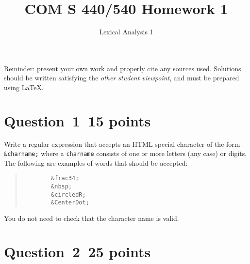 \documentclass[10pt]{article}
\title{COM S 440/540 Homework 1}
\date{}
\author{Lexical Analysis 1}
\renewcommand{\thepage}{~}
\begin{document}
\maketitle

\noindent
Reminder: present your own work and properly cite any sources used.
Solutions should be written satisfying the \emph{other student viewpoint},
and must be prepared using \LaTeX.
\renewcommand{\thepage}{~}
 
\section*{Question~1~\hfill 15 points}

Write a regular expression
that accepts an HTML special character of the form
\verb|&charname;|
where a \verb|charname| consists
of one or more letters (any case) or digits.
The following are examples of words that should be accepted:
\begin{quote}
\begin{verbatim}
		&frac34;
		&nbsp;
		&circledR;
		&CenterDot;
\end{verbatim}
\end{quote}
You do not need to check that the character name is valid.

\section*{Question~2~\hfill 25 points}
\end{document}
